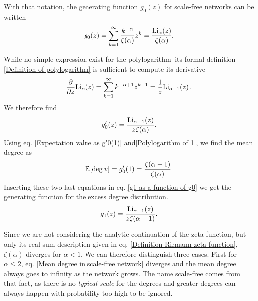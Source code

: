 \documentclass[
11pt, %
english, %
singlespacing, %
nolistspacing, %
liststotoc, %
headsepline, %
]{MastersDoctoralThesis} %
\begin{document}
With that notation, the generating function $g_0(z)$ for scale-free networks can be written
\begin{align}
	g_0(z) = \sum_{k=1}^\infty \frac{k^{-\alpha}}{\zeta(\alpha)} z^k = \frac{\mathrm{Li}_{\alpha}\!\left(z\right)}{\zeta(\alpha)}. \label{g0 for scale-free networks}
\end{align}

While no simple expression exist for the polylogarithm, its formal definition \eqref{Definition of polylogarithm} is sufficient to compute its derivative
\begin{align}
	\frac{\partial}{\partial z} \mathrm{Li}_{\alpha}\!\left(z\right) = \sum_{k = 1}^\infty k^{-\alpha + 1} z^{k-1} = \frac{1}{z} \mathrm{Li}_{\alpha - 1}\!\left(z\right). \label{Derivative of the polylogarithm}
\end{align}
We therefore find
\begin{align}
	g'_0(z) = \frac{\mathrm{Li}_{\alpha - 1}\!\left(z\right)}{z \zeta(\alpha)}.  \label{Derivative of g0 for scale-free networks}
\end{align}
Using eq. \eqref{Expectation value as g'0(1)} and\eqref{Polylogarithm of 1}, we find the mean degree as
\begin{align}
	\mathbb{E}_{}\!\left[ \mathrm{deg}_{}\, v \right] = g'_0(1) = \frac{\zeta(\alpha - 1)}{\zeta(\alpha)}. \label{Mean degree in scale-free network}
\end{align}
Inserting these two last equations in eq. \eqref{g1 as a function of g0} we get the generating function for the excess degree distribution.
\begin{align}
	g_1(z) =  \frac{\mathrm{Li}_{\alpha - 1}\!\left(z\right)}{z \zeta(\alpha - 1)}. \label{g1 for scale-free networks}
\end{align}

Since we are not considering the analytic continuation of the zeta function, but only its real sum description given in eq. \eqref{Definition Riemann zeta function}, $\zeta(\alpha)$ diverges for $\alpha < 1$. We can therefore distinguish three cases. First for $\alpha \leq 2$, eq. \eqref{Mean degree in scale-free network} diverges and the mean degree always goes to infinity as the network grows. The name scale-free comes from that fact, as there is no \emph{typical scale} for the degrees and greater degrees can always happen with probability too high to be ignored.
\end{document}
